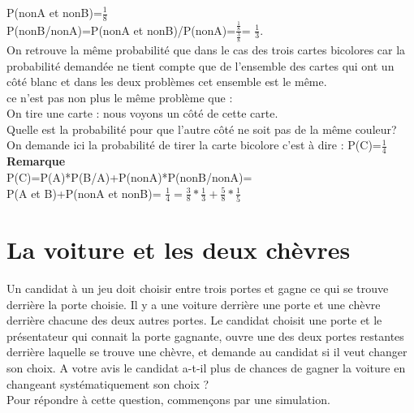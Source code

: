 \documentclass[a4paper,11pt]{book}
\begin{document}
P(nonA et nonB)=$\displaystyle \frac{1}{8}$\\
P(nonB/nonA)=P(nonA et nonB)/P(nonA)=$\displaystyle \frac{\frac{1}{8}}{\frac{3}{8}}$= $\displaystyle \frac{1}{3}$.\\
On retrouve la m\^eme probabilit\'e que dans le cas des trois cartes 
bicolores car la probabilit\'e demand\'ee  ne tient compte que de l'ensemble 
des cartes qui ont un c\^ot\'e 
blanc et dans les deux probl\`emes cet ensemble est le m\^eme.\\
ce n'est pas non plus  le m\^eme probl\`eme que :\\
On tire une carte : nous voyons un c\^ot\'e de cette carte.\\
Quelle est la probabilit\'e pour que l'autre c\^ot\'e ne soit pas de la 
m\^eme couleur?\\
On demande ici la probabilit\'e de tirer la carte bicolore c'est \`a dire :
P(C)=$\displaystyle \frac{1}{4}$\\
{\bf Remarque}\\
P(C)=P(A)*P(B/A)+P(nonA)*P(nonB/nonA)=\\
P(A et B)+P(nonA et nonB)=
$\displaystyle \frac{1}{4}=\frac{3}{8}*\frac{1}{3}+\frac{5}{8}*\frac{1}{5}$
\section{La voiture et les deux ch\`evres}
Un candidat \`a un jeu doit choisir entre trois portes et gagne ce qui se trouve derri\`ere la porte choisie. Il y a une voiture derri\`ere une porte et une ch\`evre derri\`ere chacune des deux autres portes.
Le candidat choisit une porte et le pr\'esentateur qui connait la porte
 gagnante,  ouvre une des deux portes restantes derri\`ere laquelle se trouve
une ch\`evre, et demande au candidat si il veut changer son choix.
A votre avis le candidat a-t-il plus de chances de gagner la voiture en 
changeant  syst\'ematiquement son choix ?\\
Pour r\'epondre \`a cette question, commen\c{c}ons par une simulation.
\end{document}
